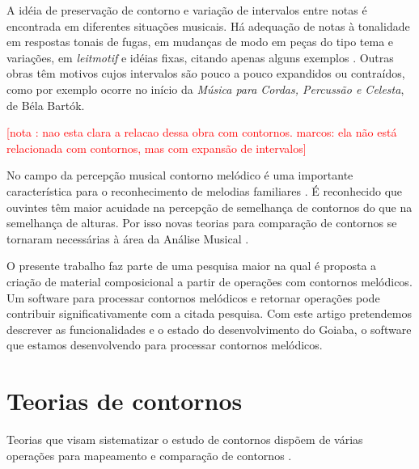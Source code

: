 \documentclass[brazil]{article}
\newcommand{\eng}[1]{\textit{#1}}
\newcommand{\opus}[1]{\textit{#1}}
\newcounter{notacounter}
\newcommand{\note}[1]{
  \addtocounter{notacounter}{1}
  \textcolor{red}{[nota \arabic{notacounter}: #1]}
}
\begin{document}
A idéia de preservação de contorno e variação de intervalos entre
notas é encontrada em diferentes situações musicais. Há adequação de
notas à tonalidade em respostas tonais de fugas, em mudanças de modo
em peças do tipo tema e variações, em \eng{leitmotif} e idéias fixas,
citando apenas alguns exemplos
\cite[p. 29]{morris87:composition}. Outras obras têm motivos cujos
intervalos são pouco a pouco expandidos ou contraídos, como por
exemplo ocorre no início da \opus{Música para Cordas, Percussão e
  Celesta}, de Béla Bartók. \note{nao esta clara a relacao dessa obra
  com contornos. marcos: ela não está relacionada com contornos, mas
  com expansão de intervalos}

No campo da percepção musical contorno melódico é uma importante
característica para o reconhecimento de melodias familiares \cite[p.
136]{dowling.ea86:music}. É reconhecido que ouvintes têm maior
acuidade na percepção de semelhança de contornos do que na semelhança
de alturas. Por isso novas teorias para comparação de contornos se
tornaram necessárias à área da Análise Musical
\cite[p. 226]{marvin.ea87:relating}.


O presente trabalho faz parte de uma pesquisa maior na qual é proposta
a criação de material composicional a partir de operações com
contornos melódicos. Um software para processar contornos melódicos e
retornar operações pode contribuir significativamente com a citada
pesquisa. Com este artigo pretendemos descrever as funcionalidades e o
estado do desenvolvimento do Goiaba, o software que estamos
desenvolvendo para processar contornos melódicos.

\section{Teorias de contornos}
\label{sec:teorias-de-contornos}

Teorias que visam sistematizar o estudo de contornos dispõem de várias
operações para mapeamento e comparação de contornos
\cite{friedmann85:methodology,friedmann87:response,morris87:composition,morris93:directions,marvin.ea87:relating,clifford95:contour,polansky.ea92:possible,quinn97:fuzzy,beard03:contour}.
\end{document}
